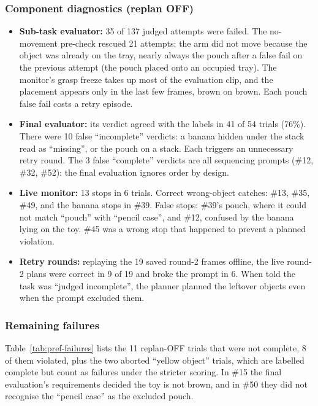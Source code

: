 \subsubsection{Component diagnostics (replan OFF)}
\begin{itemize}
  \item \textbf{Sub-task evaluator:} 35 of 137 judged attempts were failed. The
    no-movement pre-check rescued 21 attempts: the arm did not move because the object was
    already on the tray, nearly always the pouch after a false fail on the previous
    attempt (the pouch placed onto an occupied tray). The monitor's grasp freeze takes up
    most of the evaluation clip, and the placement appears only in the last few frames,
    brown on brown. Each pouch false fail costs a retry episode.
  \item \textbf{Final evaluator:} its verdict agreed with the labels in 41 of 54 trials
    (76\%). There were 10 false ``incomplete'' verdicts: a banana hidden under the stack
    read as ``missing'', or the pouch on a stack. Each triggers an unnecessary retry round.
    The 3 false ``complete'' verdicts are all sequencing prompts (\#12, \#32, \#52): the
    final evaluation ignores order by design.
  \item \textbf{Live monitor:} 13 stops in 6 trials. Correct wrong-object catches: \#13,
    \#35, \#49, and the banana stops in \#39. False stops: \#39's pouch, where it could not
    match ``pouch'' with ``pencil case'', and \#12, confused by the banana lying on the
    toy. \#45 was a wrong stop that happened to prevent a planned violation.
  \item \textbf{Retry rounds:} replaying the 19 saved round-2 frames offline, the live
    round-2 plans were correct in 9 of 19 and broke the prompt in 6. When told the task
    was ``judged incomplete'', the planner planned the leftover objects even when the
    prompt excluded them.
\end{itemize}

\subsubsection{Remaining failures}
Table~\ref{tab:pref-failures} lists the 11 replan-OFF trials that were not complete, 8 of
them violated, plus the two aborted ``yellow object'' trials, which are labelled complete
but count as failures under the stricter scoring. In \#15 the final evaluation's requirements decided the toy is not brown,
and in \#50 they did not recognise the ``pencil case'' as the excluded pouch.

